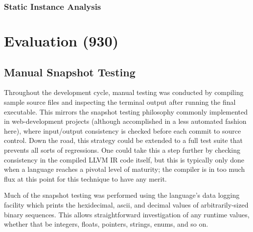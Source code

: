 \documentclass[12pt,a4paper,twoside]{report}
\begin{document}
\subsection{Static Instance Analysis}

\chapter{Evaluation (930)}

\section{Manual Snapshot Testing}

Throughout the development cycle, manual testing was conducted by compiling sample source files and inspecting the terminal output after running the final executable. This mirrors the snapshot testing philosophy commonly implemented in web-development projects (although accomplished in a less automated fashion here), where input/output consistency is checked before each commit to source control. Down the road, this strategy could be extended to a full test suite that prevents all sorts of regressions. One could take this a step further by checking consistency in the compiled LLVM IR code itself, but this is typically only done when a language reaches a pivotal level of maturity; the compiler is in too much flux at this point for this technique to have any merit.

Much of the snapshot testing was performed using the language's data logging facility which prints the hexidecimal, ascii, and decimal values of arbitrarily-sized binary sequences. This allows straightforward investigation of any runtime values, whether that be integers, floats, pointers, strings, enums, and so on.



\end{document}
